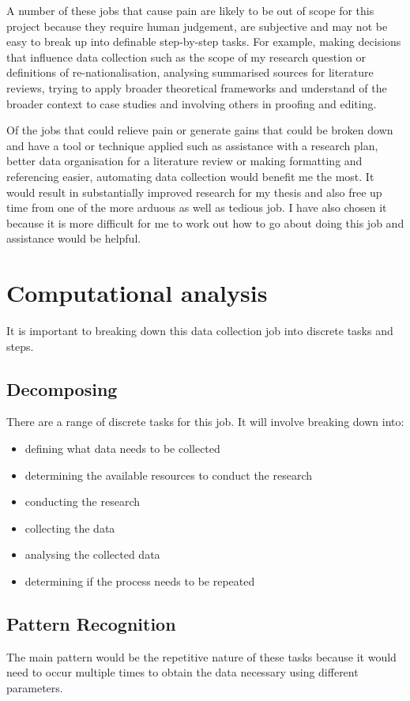 \documentclass{article}
\begin{document}
A number of these jobs that cause pain are likely to be out of scope for this project because they require human judgement, are subjective and may not be easy to break up into definable step-by-step tasks. For example, making decisions that influence data collection such as the scope of my research question or definitions of re-nationalisation, analysing summarised sources for literature reviews, trying to apply broader theoretical frameworks and understand of the broader context to case studies and involving others in proofing and editing.\par
Of the jobs that could relieve pain or generate gains that could be broken down and have a tool or technique applied such as assistance with a research plan, better data organisation for a literature review or making formatting and referencing easier, automating data collection would benefit me the most. It would result in substantially improved research for my thesis and also free up time from one of the more arduous as well as tedious job. I have also chosen it because it is more difficult for me to work out how to go about doing this job and assistance would be helpful. 

\section*{Computational analysis}
It is important to breaking down this data collection job into discrete tasks and steps. 

\subsection*{Decomposing}
There are a range of discrete tasks for this job. It will involve breaking down into:
\begin{itemize}
    \item defining what data needs to be collected
    \item determining the available resources to conduct the research
    \item conducting the research
    \item collecting the data
    \item analysing the collected data
    \item determining if the process needs to be repeated
\end{itemize}

\subsection*{Pattern Recognition}
The main pattern would be the repetitive nature of these tasks because it would need to occur multiple times to obtain the data necessary using different parameters. 
\end{document}
